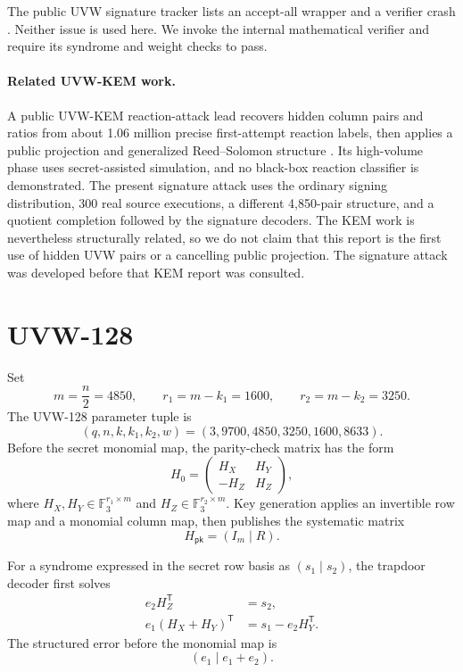 \documentclass[11pt,a4paper]{article}
\newcommand{\F}{\mathbb{F}}
\newcommand{\pk}{\mathsf{pk}}
\begin{document}
The public UVW signature tracker lists an accept-all wrapper and a verifier
crash \cite{ngcc-sign}.  Neither issue is used here.  We invoke the internal
mathematical verifier and require its syndrome and weight checks to pass.

\paragraph{Related UVW-KEM work.}
A public UVW-KEM reaction-attack lead recovers hidden column pairs and ratios
from about 1.06 million precise first-attempt reaction labels, then applies a
public projection and generalized Reed--Solomon structure
\cite{ngcc-kem,kem-forum}.  Its high-volume phase uses secret-assisted
simulation, and no black-box reaction classifier is demonstrated.  The
present signature attack uses the ordinary signing distribution, 300 real
source executions, a different 4,850-pair structure, and a quotient
completion followed by the signature decoders.  The KEM work is nevertheless
structurally related, so we do not claim that this report is the first use of
hidden UVW pairs or a cancelling public projection.  The signature attack was
developed before that KEM report was consulted.

\section{UVW-128}

Set
\[
 m=\frac n2=4850,\qquad
 r_1=m-k_1=1600,\qquad
 r_2=m-k_2=3250.
\]
The UVW-128 parameter tuple is
\[
        (q,n,k,k_1,k_2,w)=(3,9700,4850,3250,1600,8633).
\]
Before the secret monomial map, the parity-check matrix has the form
\begin{equation}
 H_0=
 \begin{pmatrix}
  H_X&H_Y\\
  -H_Z&H_Z
 \end{pmatrix},
 \label{eq:h0}
\end{equation}
where $H_X,H_Y\in\F_3^{r_1\times m}$ and
$H_Z\in\F_3^{r_2\times m}$.  Key generation applies an invertible row map and
a monomial column map, then publishes the systematic matrix
\begin{equation}
              H_{\pk}=(I_m\mid R).
 \label{eq:systematic}
\end{equation}

For a syndrome expressed in the secret row basis as
$(s_1\mid s_2)$, the trapdoor decoder first solves
\begin{align}
 e_2H_Z^{\mathsf T}&=s_2,\label{eq:decz}\\
 e_1(H_X+H_Y)^{\mathsf T}
     &=s_1-e_2H_Y^{\mathsf T}.\label{eq:decxy}
\end{align}
The structured error before the monomial map is
\begin{equation}
                    (e_1\mid e_1+e_2).
 \label{eq:structured}
\end{equation}
\end{document}
